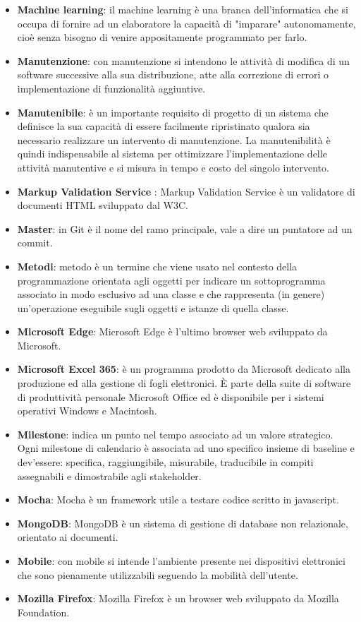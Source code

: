 \documentclass[a4paper, oneside, openany]{article}
\begin{document}
\begin{itemize}
\item \textbf{Machine learning}: il machine learning è una branca dell'informatica che si occupa di fornire ad un elaboratore la capacità di "imparare" autonomamente, cioè senza bisogno di venire appositamente programmato per farlo.
\item \textbf{Manutenzione}: con manutenzione si intendono le attività di modifica di un software successive alla sua distribuzione, atte alla correzione di errori o implementazione di funzionalità aggiuntive.
\item \textbf{Manutenibile}: è un importante requisito di progetto di un sistema che definisce la sua capacità di essere facilmente ripristinato qualora sia necessario realizzare un intervento di manutenzione. La manutenibilità è quindi indispensabile al sistema per ottimizzare l'implementazione delle attività manutentive e si misura in tempo e costo del singolo intervento.
\item \textbf{Markup Validation Service }: Markup Validation Service è un validatore di documenti HTML sviluppato dal W3C.
\item \textbf{Master}: in Git è il nome del ramo principale, vale a dire un puntatore ad un commit.
\item \textbf{Metodi}: metodo è un termine che viene usato nel contesto della programmazione orientata agli oggetti per indicare un sottoprogramma associato in modo esclusivo ad una classe e che rappresenta (in genere) un'operazione eseguibile sugli oggetti e istanze di quella classe.
\item \textbf{Microsoft Edge}: Microsoft Edge è l'ultimo browser web sviluppato da Microsoft.
\item \textbf{Microsoft Excel 365}: è un programma prodotto da Microsoft dedicato alla produzione ed alla gestione di fogli elettronici. È parte della suite di software di produttività personale Microsoft Office ed è disponibile per i sistemi operativi Windows e Macintosh.
\item \textbf{Milestone}: indica un punto nel tempo associato ad un valore strategico. Ogni milestone di calendario è associata ad uno specifico insieme di baseline e dev'essere: specifica, raggiungibile, misurabile, traducibile in compiti assegnabili e dimostrabile agli stakeholder.
\item \textbf{Mocha}: Mocha è un framework utile a testare codice scritto in javascript.
\item \textbf{MongoDB}: MongoDB è un sistema di gestione di database non relazionale, orientato ai documenti.
\item \textbf{Mobile}: con mobile si intende l'ambiente presente nei dispositivi elettronici che sono pienamente utilizzabili seguendo la mobilità dell'utente.
\item \textbf{Mozilla Firefox}: Mozilla Firefox è un browser web sviluppato da Mozilla Foundation.
\end{itemize}
\end{document}
